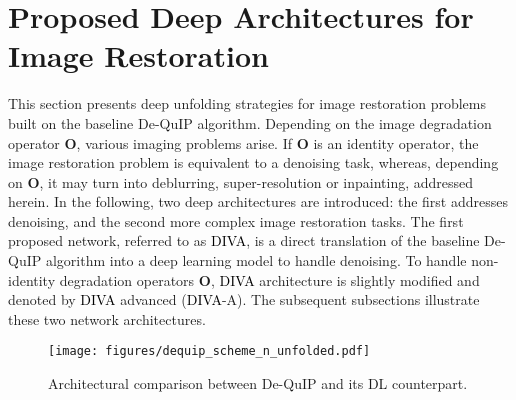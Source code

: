 \documentclass[10pt,journal,compsoc]{IEEEtran}
\newcommand{\dk}{\textcolor{black}}
\def\bsO{{\boldsymbol{O}}}
\begin{document}






\section{Proposed Deep Architectures for Image Restoration}
\label{sec:deep_aechi}
This section presents deep unfolding strategies for image restoration problems built on the baseline De-QuIP algorithm. Depending on the image degradation operator $\bsO$, various imaging problems arise. If $\bsO$ is an identity operator, the image restoration problem is equivalent to a denoising task, whereas, depending on $\bsO$, it may turn into deblurring, super-resolution or inpainting, addressed herein. In the following, two deep architectures are introduced: the first addresses denoising, and the second more complex image restoration tasks. The first proposed network, referred to as \dk{DIVA}, is a direct translation of the baseline De-QuIP algorithm into a deep learning model to handle denoising. To handle non-identity degradation operators $\bsO$, \dk{DIVA} architecture is slightly modified and denoted by \dk{DIVA} advanced (\dk{DIVA}-A). The subsequent subsections illustrate these two network architectures.








\begin{figure}[t!]
\centering
\texttt{[image: figures/dequip\_scheme\_n\_unfolded.pdf]}
\caption{Architectural comparison between De-QuIP and its DL counterpart.}
\label{fig:Arch_com}
\end{figure}
\end{document}
